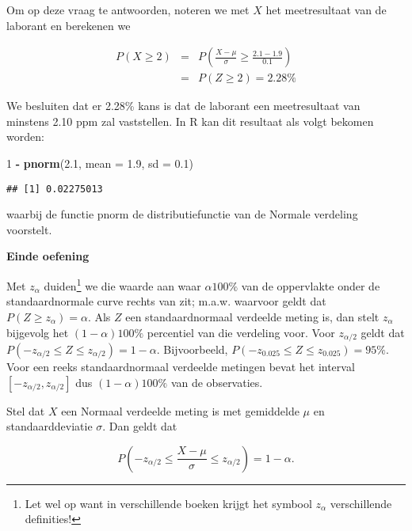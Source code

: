 \documentclass[
  12pt,dutch,coursenotes]{book}
\newenvironment{Shaded}{\begin{snugshade}}{\end{snugshade}}
\newcommand{\DataTypeTok}[1]{\textcolor[rgb]{0.13,0.29,0.53}{#1}}
\newcommand{\DecValTok}[1]{\textcolor[rgb]{0.00,0.00,0.81}{#1}}
\newcommand{\FloatTok}[1]{\textcolor[rgb]{0.00,0.00,0.81}{#1}}
\newcommand{\KeywordTok}[1]{\textcolor[rgb]{0.13,0.29,0.53}{\textbf{#1}}}
\newcommand{\NormalTok}[1]{#1}
\newcommand{\OperatorTok}[1]{\textcolor[rgb]{0.81,0.36,0.00}{\textbf{#1}}}
\newcommand{\StringTok}[1]{\textcolor[rgb]{0.31,0.60,0.02}{#1}}
\theoremstyle{definition}
\theoremstyle{definition}
\theoremstyle{definition}
\theoremstyle{remark}
\begin{document}
Om op deze vraag te antwoorden, noteren we met \(X\) het meetresultaat van de
laborant en berekenen we

\begin{eqnarray*}
P(X\geq 2)&=&P\left(\frac{X-\mu}{\sigma}\geq \frac{2.1-1.9}{0.1}\right) \\
&=&P(Z\geq 2) = 2.28\%
\end{eqnarray*}

We besluiten dat er 2.28\% kans is dat de laborant een meetresultaat van
minstens 2.10 ppm zal vaststellen. In R kan dit resultaat als volgt bekomen worden:

\begin{Shaded}
\begin{Highlighting}[]
\DecValTok{1} \OperatorTok{{-}}\StringTok{ }\KeywordTok{pnorm}\NormalTok{(}\FloatTok{2.1}\NormalTok{, }\DataTypeTok{mean =} \FloatTok{1.9}\NormalTok{, }\DataTypeTok{sd =} \FloatTok{0.1}\NormalTok{)}
\end{Highlighting}
\end{Shaded}

\begin{verbatim}
## [1] 0.02275013
\end{verbatim}

waarbij de functie pnorm de distributiefunctie van de Normale verdeling voorstelt.

\textbf{Einde oefening}

Met \(z_{\alpha}\) duiden\footnote{Let wel op want in verschillende boeken krijgt het symbool \(z_{\alpha}\) verschillende definities!} we die waarde aan waar \(\alpha100\%\) van de
oppervlakte onder de standaardnormale curve rechts van zit; m.a.w. waarvoor
geldt dat \(P(Z \geq z_{\alpha}) = \alpha\). Als \(Z\) een standaardnormaal
verdeelde meting is, dan stelt \(z_{\alpha}\) bijgevolg het \((1-\alpha)100\%\)
percentiel van die verdeling voor. Voor \(z_{\alpha/2}\) geldt dat \(P(-z_{\alpha/2}\leq Z \leq z_{\alpha/2}) = 1-\alpha\). Bijvoorbeeld, \(P( - z_{0.025}\leq Z \leq z_{0.025}) = 95\%\). Voor een reeks standaardnormaal
verdeelde metingen bevat het interval \([-z_{\alpha/2},z_{\alpha/2}]\) dus \((1-\alpha)100\%\) van de observaties.

Stel dat \(X\) een Normaal verdeelde meting is met gemiddelde \(\mu\) en
standaarddeviatie \(\sigma\). Dan geldt dat

\begin{equation*}
P\left( - z_{\alpha/2}\leq \frac{X - \mu}{\sigma} \leq z_{\alpha/2}\right) =
1-\alpha .
\end{equation*}
\end{document}
